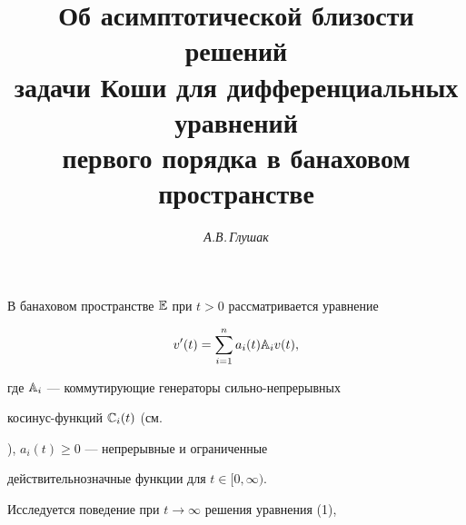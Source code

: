 

 


 


\setcounter{page}{14} 








\author{\it А.В.\,Глушак} 


\title{Об асимптотической близости решений\\ 


задачи Коши для дифференциальных уравнений\\ 


первого порядка в банаховом пространстве} 


 


\date{} 


\pagestyle{plain} 


 


 


\maketitle 


 


В банаховом пространстве $\Bbb E$ при $t>0$ рассматривается уравнение 


\begin{equation} 


v'(t)=\sum^n_{i=1}a_i(t)\Bbb A_iv(t), 


\end{equation} 


где $\Bbb A_i$ --- коммутирующие генераторы сильно-непрерывных 


косинус-функций $\Bbb C_i(t)$ (см. 


\cite{Vas}), $a_i(t)\ge 0$ --- непрерывные и ограниченные 


действительнозначные функции для $t\in[0,\infty)$. 


Исследуется поведение при $t\to\infty$ решения уравнения (1), 


